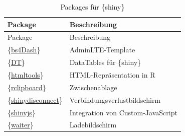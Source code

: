 \documentclass[
]{article}
\begin{document}
\begin{longtable}[]{@{}ll@{}}
\caption{\label{tab:pkg-shiny} Packages für \{shiny\}}\tabularnewline
\toprule
Package & Beschreibung \\
\midrule
\endfirsthead
\toprule
Package & Beschreibung \\
\midrule
\endhead
\{\href{https://cran.r-project.org/web/packages/bs4Dash/index.html}{bs4Dash}\} & AdminLTE-Template \\
\{\href{https://cran.r-project.org/web/packages/DT/index.html}{DT}\} & DataTables für \{shiny\} \\
\{\href{https://cran.r-project.org/web/packages/htmltools/index.html}{htmltools}\} & HTML-Repräsentation in R \\
\{\href{https://cran.r-project.org/web/packages/rclipboard/index.html}{rclipboard}\} & Zwischenablage \\
\{\href{https://cran.r-project.org/web/packages/shinydisconnect/index.html}{shinydisconnect}\} & Verbindungsverlustbildschirm \\
\{\href{https://cran.r-project.org/web/packages/shinyjs/index.html}{shinyjs}\} & Integration von Custom-JavaScript \\
\{\href{https://cran.r-project.org/web/packages/waiter/index.html}{waiter}\} & Ladebildschirm \\
\bottomrule
\end{longtable}
\end{document}
